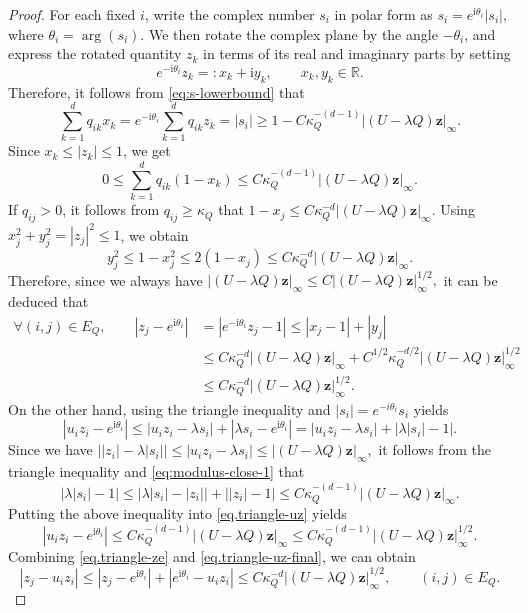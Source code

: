 \documentclass[11pt,twoside, a4paper]{article}
\numberwithin{equation}{section}
\numberwithin{figure}{section}
\theoremstyle{plain} %
\theoremstyle{definition}
\theoremstyle{remark}
\newcommand{\1} {\mspace{1 mu}}
\newcommand{\2} {\mspace{2 mu}}
\begin{document}
\begin{proof}
For each fixed \(i\), write the complex number \(s_i\) in polar form as
$
s_i=e^{\mathrm i\theta_i}|s_i|,
$
where \(\theta_i=\arg(s_i)\).
We then rotate the complex plane by the angle \(-\theta_i\), and express the rotated quantity \(z_k\) in terms of its real and imaginary parts by setting
\[
e^{-\mathrm i\theta_i}z_k=:x_k+\mathrm i y_k,\qquad x_k,y_k\in\mathbb R.
\]
Therefore, it follows from \eqref{eq:s-lowerbound} that
\[
\sum_{k=1}^d q_{ik}x_k
=
e^{-\mathrm i\theta_i}\sum_{k=1}^d q_{ik}z_k
=
|s_i|
\ge 1-C\kappa_Q^{-(d-1)}|(U-\lambda Q)\mathbf z|_\infty.
\]
Since \(x_k\le |z_k|\le 1\), we get
\[
0\le \sum_{k=1}^d q_{ik}(1-x_k)\le C\kappa_Q^{-(d-1)}|(U-\lambda Q)\mathbf z|_\infty.
\]
If $q_{ij}>0$, it follows from \(q_{ij}\ge \kappa_Q\) that
$
1-x_j\le C\kappa_Q^{-d}|(U-\lambda Q)\mathbf z|_\infty.
$
Using \(x_j^2+y_j^2=|z_j|^2\le 1\), we obtain
\[
y_j^2\le 1-x_j^2\le 2(1-x_j)\le C\kappa_Q^{-d}|(U-\lambda Q)\mathbf z|_\infty.
\]
Therefore, since we always have
$
|(U-\lambda Q)\mathbf z|_\infty\le C|(U-\lambda Q)\mathbf z|_\infty^{1/2},
$
it can be deduced that
\begin{equation}\label{eq.triangle-ze}
  \begin{aligned}
    \forall(i,j)\in E_Q,\qquad
|z_j-e^{\mathrm i\theta_i}|
&=
|e^{-\mathrm i\theta_i}z_j-1|
\le |x_j-1|+|y_j| \\
&\le C\kappa_Q^{-d}|(U-\lambda Q)\mathbf z|_\infty
+C^{1/2}\kappa_Q^{-d/2}|(U-\lambda Q)\mathbf z|_\infty^{1/2}\\
&\le C\kappa_Q^{-d}|(U-\lambda Q)\mathbf z|_\infty^{1/2}.
\end{aligned}
\end{equation}
On the other hand, using the triangle inequality and $|s_i|=e^{-i\theta_i}s_i$ yields
\begin{equation}\label{eq.triangle-uz}
  |u_i z_i-e^{\mathrm i\theta_i}|
\le |u_i z_i-\lambda s_i|+|\lambda s_i-e^{\mathrm i\theta_i}|= |u_i z_i-\lambda s_i|+\bigl|\lambda|s_i|-1\bigr|.
\end{equation}
Since we have
$
\big||z_i|-\lambda|s_i|\big|\le |u_iz_i-\lambda s_i|\le \big|(U-\lambda Q)\mathbf{z}\big|_\infty,
$
it follows from the triangle inequality and \eqref{eq:modulus-close-1} that
\begin{equation*}
  \big|\lambda|s_i|-1\big|\le\big|\lambda|s_i|-|z_i|\big|+\big||z_i|-1\big|\le C\kappa_Q^{-(d-1)}\big|(U-\lambda Q)\mathbf{z}\big|_\infty.
\end{equation*}
Putting the above inequality into \eqref{eq.triangle-uz} yields
\begin{equation}\label{eq.triangle-uz-final}
  |u_i z_i-e^{\mathrm i\theta_i}|\le C\kappa_Q^{-(d-1)}|(U-\lambda Q)\mathbf z|_\infty\le C\kappa_Q^{-(d-1)}|(U-\lambda Q)\mathbf z|_\infty^{1/2}.
\end{equation}
Combining \eqref{eq.triangle-ze} and \eqref{eq.triangle-uz-final}, we can obtain
\begin{equation}\label{eq:edge-phase-alignment}
    |z_j-u_i z_i|\le|z_j-e^{\mathrm i\theta_i}|+|e^{\mathrm i\theta_i}-u_iz_i| \le C\kappa_Q^{-d}|(U-\lambda Q)\mathbf z|_\infty^{1/2},\qquad(i,j)\in E_Q.
\end{equation}


\end{proof}
\end{document}
